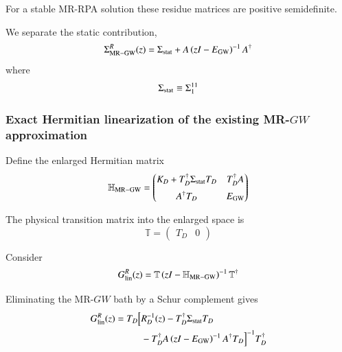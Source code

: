 \documentclass[aip,jcp,reprint,noshowkeys,superscriptaddress]{revtex4-1}
\begin{document}
For a stable MR-RPA solution these residue matrices are positive
semidefinite.

We separate the static contribution,
\begin{equation}
  \Sigma_{\rm MR-GW}^{R}(z)
  =
  \Sigma_{\rm stat}
  +
  A
  \left(
    zI-E_{\rm GW}
  \right)^{-1}
  A^\dagger
  \label{eq:full-MRGW-selfenergy-pole}
\end{equation}
where
\begin{equation}
  \Sigma_{\rm stat}
  \equiv
  \Sigma_1^{11}
\end{equation}


\subsubsection{Exact Hermitian linearization of the existing MR-$GW$ approximation}

Define the enlarged Hermitian matrix
\begin{equation}
  \mathbb H_{\rm MR-GW}
  =
  \begin{pmatrix}
    K_D
    +
    T_D^\dagger
    \Sigma_{\rm stat}
    T_D
    &
    T_D^\dagger A
    \\[2mm]
    A^\dagger T_D
    &
    E_{\rm GW}
  \end{pmatrix}
  \label{eq:H-MRGW}
\end{equation}

The physical transition matrix into the enlarged space is
\begin{equation}
  \mathbb T
  =
  \begin{pmatrix}
    T_D & 0
  \end{pmatrix}
  \label{eq:T-enlarged}
\end{equation}

Consider
\begin{equation}
  G_{\rm lin}^{R}(z)
  =
  \mathbb T
  \left(
    zI-\mathbb H_{\rm MR-GW}
  \right)^{-1}
  \mathbb T^\dagger
  \label{eq:G-linearized-MRGW}
\end{equation}

Eliminating the MR-$GW$ bath by a Schur complement gives
\begin{equation}
  \begin{aligned}
  G_{\rm lin}^{R}(z)
  =
  T_D
  \Big[
  &
  R_D^{-1}(z)
  -
  T_D^\dagger
  \Sigma_{\rm stat}
  T_D
  \\
  &
  -
  T_D^\dagger
  A
  \left(
    zI-E_{\rm GW}
  \right)^{-1}
  A^\dagger
  T_D
  \Big]^{-1}
  T_D^\dagger
  \end{aligned}
\end{equation}
\end{document}
